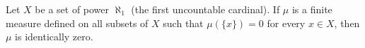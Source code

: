 Let $X$ be a set of power $\aleph_1$ (the first uncountable cardinal). If $\mu$ is a finite measure defined on all subsets of $X$ such that $\mu(\{x\}) = 0$ for every $x \in X$, then $\mu$ is identically zero.